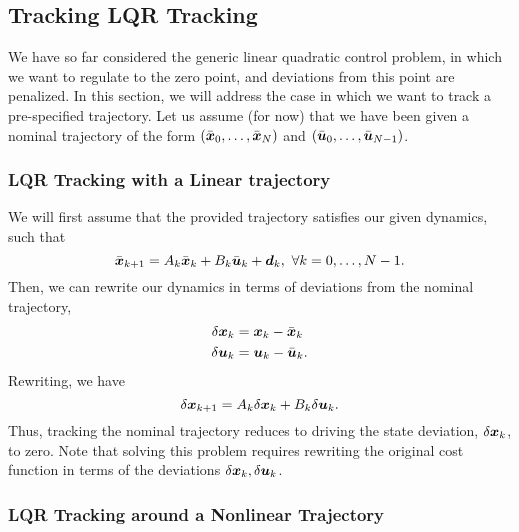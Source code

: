 \subsection{Tracking LQR Tracking}

We have so far considered the generic linear quadratic control problem, in which we want to regulate to the zero point, and deviations from this point are penalized. In this section, we will address the case in which we want to track a pre-specified trajectory. Let us assume (for now) that we have been given a nominal trajectory of the form $(\bar{\bm{x}}_0, \ldots, \bar{\bm{x}}_{N})$ and $(\bar{\bm{u}}_0, \ldots, \bar{\bm{u}}_{N-1})$. 

\subsubsection{LQR Tracking with a Linear trajectory}

We will first assume that the provided trajectory satisfies our given dynamics, such that 
\begin{equation}
\bar{\bm{x}}_{k+1} = A_k \bar{\bm{x}}_k + B_k \bar{\bm{u}}_k + \bm{d}_k,\,\, \forall k = 0, \ldots, N-1.    
\end{equation}
Then, we can rewrite our dynamics in terms of deviations from the nominal trajectory, 
\begin{align}
    \delta \bm{x}_k &= \bm{x}_k - \bar{\bm{x}}_k\\
    \delta \bm{u}_k &= \bm{u}_k - \bar{\bm{u}}_k.
\end{align}
Rewriting, we have 
\begin{equation}
    \delta \bm{x}_{k+1} = A_k \delta \bm{x}_k + B_k \delta \bm{u}_k.
\end{equation}
Thus, tracking the nominal trajectory reduces to driving the state deviation, $\delta \bm{x}_k$, to zero. Note that solving this problem requires rewriting the original cost function in terms of the deviations $\delta \bm{x}_k, \delta \bm{u}_k$. 


\subsubsection{LQR Tracking around a Nonlinear Trajectory}

